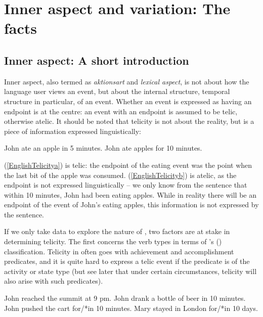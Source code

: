 \documentclass[output=paper]{langsci/langscibook}
\begin{document}
\section{Inner aspect and variation: The facts}\label{sec:17.2}

\subsection{Inner aspect: A short introduction}\label{sub:17.2.1}

Inner aspect, also termed as \textit{aktionsart} and \textit{lexical aspect}, is not about how
the language user views an event, but about the internal structure, temporal
structure in particular, of an event. Whether an event is expressed as having
an endpoint is at the centre: an event with an endpoint is assumed to be telic,
otherwise atelic. It should be noted that telicity is not about the reality,
but is a piece of information expressed linguistically:

\begin{exe}
\ex\begin{xlist}
	\ex\label{EnglishTelicitya} John ate an apple in 5 minutes.
    \ex\label{EnglishTelicityb} John ate apples for 10 minutes.
\end{xlist}
\end{exe}

(\ref{EnglishTelicitya}) is telic: the endpoint of the eating event was the
point when the last bit of the apple was consumed. (\ref{EnglishTelicityb}) is
atelic, as the endpoint is not expressed linguistically -- we only know from
the sentence that within 10 minutes, John had been eating apples. While in
reality there will be an endpoint of the event of John's eating apples, this
information is not expressed by the sentence.

If we only take  data to explore the nature of , two factors
are at stake in determining telicity. The first concerns the verb types in
terms of \citeauthor{vendler1957verbs}'s (\citeyear{vendler1957verbs})
classification. Telicity in  often goes with achievement and
accomplishment predicates, and it is quite hard to express a telic event if the
predicate is of the activity or state type (but see later that under certain
circumstances, telicity will also arise with such predicates).

\begin{exe}
\ex\begin{xlist}
	\ex\label{VendlerAchievement} John reached the summit at 9 pm.
    \ex\label{VendlerAccomplishment} John drank a bottle of beer in 10 minutes.
    \ex\label{VendlerActivity} John pushed the cart for/*in 10 minutes.
    \ex\label{VendlerState} Mary stayed in London for/*in 10 days.
\end{xlist}
\end{exe}
\end{document}
